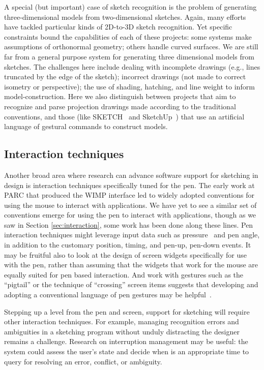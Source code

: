 A special (but important) case of sketch recognition is the problem of
generating three-dimensional models from two-dimensional
sketches. Again, many efforts have tackled particular kinds of
2D-to-3D sketch recognition. Yet specific constraints bound the
capabilities of each of these projects: some systems make assumptions
of orthonormal geometry; others handle curved surfaces. We are still
far from a general purpose system for generating three dimensional
models from sketches. The challenges here include dealing with
incomplete drawings (e.g., lines truncated by the edge of the sketch);
incorrect drawings (not made to correct isometry or perspective); the
use of shading, hatching, and line weight to inform
model-construction. Here we also distinguish between projects that aim
to recognize and parse projection drawings made according to the
traditional conventions, and those (like SKETCH~\cite{zeleznik-sketch}
and SketchUp~\cite{google-sketchup}) that use an artificial language
of gestural commands to construct models.

\subsection{Interaction techniques}

Another broad area where research can advance software support for
sketching in design is interaction techniques specifically tuned for
the pen. The early work at PARC that produced the WIMP interface led
to widely adopted conventions for using the mouse to interact with
applications. We have yet to see a similar set of conventions emerge
for using the pen to interact with applications, though as we saw in
Section \ref{sec:interaction}, some work has been done along these
lines. Pen interaction techniques might leverage input data such as
pressure~\cite{ramos-pressure-widgets} and pen angle, in addition to
the customary position, timing, and pen-up, pen-down events. It may be
fruitful also to look at the design of screen widgets specifically for
use with the pen, rather than assuming that the widgets that work for
the mouse are equally suited for pen based interaction. And work with
gestures such as the ``pigtail'' or the technique of ``crossing''
screen items suggests that developing and adopting a conventional
language of pen gestures may be
helpful~\cite{hinckley-scriboli,apitz-crossy}.

Stepping up a level from the pen and screen, support for sketching
will require other interaction techniques. For example, managing
recognition errors and ambiguities in a sketching program without
unduly distracting the designer remains a challenge. Research on
interruption management may be useful: the system could assess the
user's state and decide when is an appropriate time to query for
resolving an error, conflict, or ambiguity.

